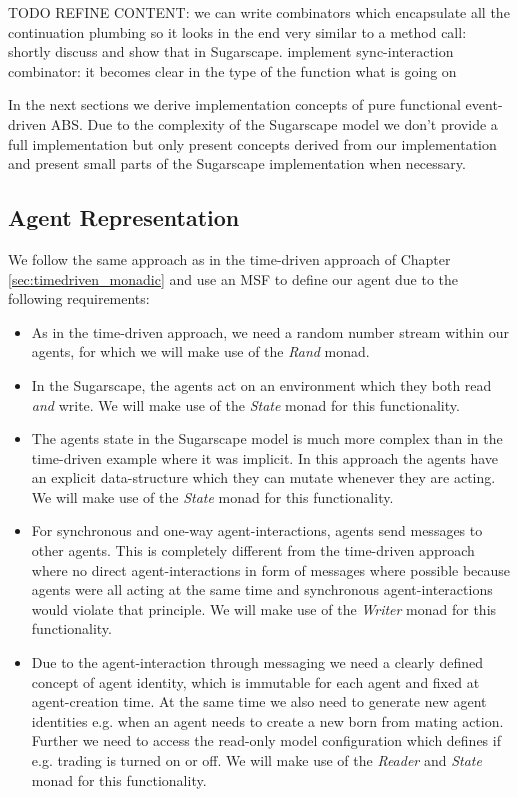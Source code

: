 TODO REFINE CONTENT: we can write combinators which encapsulate all the continuation plumbing so it looks in the end very similar to a method call: shortly discuss and show that in Sugarscape. implement sync-interaction combinator: it becomes clear in the type of the function what is going on

In the next sections we derive implementation concepts of pure functional event-driven ABS. Due to the complexity of the Sugarscape model we don't provide a full implementation but only present concepts derived from our implementation and present small parts of the Sugarscape implementation when necessary.

\subsection{Agent Representation}
We follow the same approach as in the time-driven approach of Chapter \ref{sec:timedriven_monadic} and use an MSF to define our agent due to the following requirements:

\begin{itemize}
	\item As in the time-driven approach, we need a random number stream within our agents, for which we will make use of the \textit{Rand} monad.
	
	\item In the Sugarscape, the agents act on an environment which they both read \textit{and} write. We will make use of the \textit{State} monad for this functionality. 
	
	\item The agents state in the Sugarscape model is much more complex than in the time-driven example where it was implicit. In this approach the agents have an explicit data-structure which they can mutate whenever they are acting. We will make use of the \textit{State} monad for this functionality.
	
	\item For synchronous and one-way agent-interactions, agents send messages to other agents. This is completely different from the time-driven approach where no direct agent-interactions in form of messages where possible because agents were all acting at the same time and synchronous agent-interactions would violate that principle. We will make use of the \textit{Writer} monad for this functionality.

	\item Due to the agent-interaction through messaging we need a clearly defined concept of agent identity, which is immutable for each agent and fixed at agent-creation time. At the same time we also need to generate new agent identities e.g. when an agent needs to create a new born from mating action. Further we need to access the read-only model configuration which defines if e.g. trading is turned on or off. We will make use of the \textit{Reader} and \textit{State} monad for this functionality.
\end{itemize}

